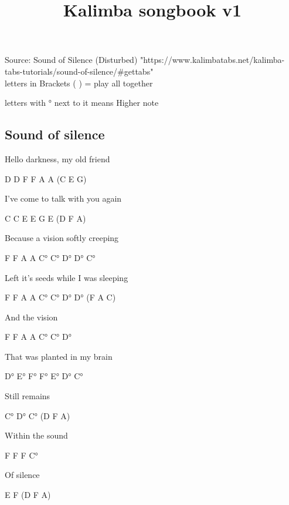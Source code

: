 \documentclass{memoir}
\title{Kalimba songbook v1}
\newenvironment{song}[1]
{ 
\subsection{#1}   
\noindent \huge \ttfamily \par
}
{  }
\begin{document}
Source: Sound of Silence (Disturbed)
"https://www.kalimbatabs.net/kalimba-tabs-tutorials/sound-of-silence/\#gettabs" \\
letters in Brackets (     ) = play all together 

letters with °  next to it means Higher note

\begin{song}{Sound of silence}
Hello darkness, my old friend 

D  D  F  F  A  A    (C E G)

I’ve come to talk with you again

C  C  E  E  G E   (D F A)

Because a vision softly creeping

F  F  A  A  C°  C°   D°  D°  C°

Left it’s seeds while I was sleeping

F  F  A  A  C°  C°   D°  D°   (F A C)

And the vision 

F  F  A  A  C°  C°   D°

That was planted in my brain

D°  E°  F°  F°  E°  D°  C°

Still remains

C°  D°  C°  (D F A)

Within the sound

F  F  F  C°     

Of silence

E  F   (D F A)

\end{song}
\end{document}
